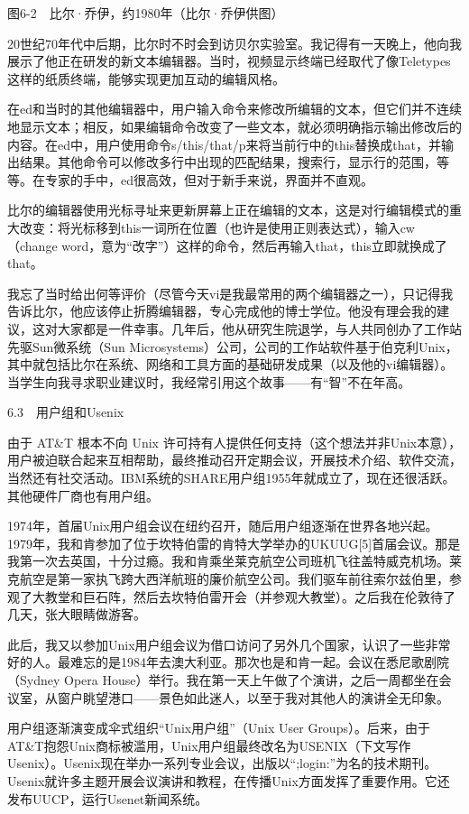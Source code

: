 \documentclass[a4paper,12pt,UTF8,twoside]{ctexbook}
\begin{document}
{{图6-2　比尔·乔伊，约1980年（比尔·乔伊供图）

20世纪70年代中后期，比尔时不时会到访贝尔实验室。我记得有一天晚上，他向我展示了他正在研发的新文本编辑器。当时，视频显示终端已经取代了像Teletypes这样的纸质终端，能够实现更加互动的编辑风格。

在ed和当时的其他编辑器中，用户输入命令来修改所编辑的文本，但它们并不连续地显示文本；相反，如果编辑命令改变了一些文本，就必须明确指示输出修改后的内容。在ed中，用户使用命令s/this/that/p来将当前行中的this替换成that，并输出结果。其他命令可以修改多行中出现的匹配结果，搜索行，显示行的范围，等等。在专家的手中，ed很高效，但对于新手来说，界面并不直观。

比尔的编辑器使用光标寻址来更新屏幕上正在编辑的文本，这是对行编辑模式的重大改变：将光标移到this一词所在位置（也许是使用正则表达式），输入cw（change word，意为“改字”）这样的命令，然后再输入that，this立即就换成了that。

我忘了当时给出何等评价（尽管今天vi是我最常用的两个编辑器之一），只记得我告诉比尔，他应该停止折腾编辑器，专心完成他的博士学位。他没有理会我的建议，这对大家都是一件幸事。几年后，他从研究生院退学，与人共同创办了工作站先驱Sun微系统（Sun Microsystems）公司，公司的工作站软件基于伯克利Unix，其中就包括比尔在系统、网络和工具方面的基础研发成果（以及他的vi编辑器）。当学生向我寻求职业建议时，我经常引用这个故事——有“智”不在年高。





6.3　用户组和Usenix


由于 AT\&T 根本不向 Unix 许可持有人提供任何支持（这个想法并非Unix本意），用户被迫联合起来互相帮助，最终推动召开定期会议，开展技术介绍、软件交流，当然还有社交活动。IBM系统的SHARE用户组1955年就成立了，现在还很活跃。其他硬件厂商也有用户组。

1974年，首届Unix用户组会议在纽约召开，随后用户组逐渐在世界各地兴起。1979年，我和肯参加了位于坎特伯雷的肯特大学举办的UKUUG[5]首届会议。那是我第一次去英国，十分过瘾。我和肯乘坐莱克航空公司班机飞往盖特威克机场。莱克航空是第一家执飞跨大西洋航班的廉价航空公司。我们驱车前往索尔兹伯里，参观了大教堂和巨石阵，然后去坎特伯雷开会（并参观大教堂）。之后我在伦敦待了几天，张大眼睛做游客。

此后，我又以参加Unix用户组会议为借口访问了另外几个国家，认识了一些非常好的人。最难忘的是1984年去澳大利亚。那次也是和肯一起。会议在悉尼歌剧院（Sydney Opera House）举行。我在第一天上午做了个演讲，之后一周都坐在会议室，从窗户眺望港口——景色如此迷人，以至于我对其他人的演讲全无印象。

用户组逐渐演变成伞式组织“Unix用户组”（Unix User Groups）。后来，由于AT\&T抱怨Unix商标被滥用，Unix用户组最终改名为USENIX（下文写作Usenix）。Usenix现在举办一系列专业会议，出版以“;login:”为名的技术期刊。Usenix就许多主题开展会议演讲和教程，在传播Unix方面发挥了重要作用。它还发布UUCP，运行Usenet新闻系统。





}}
\end{document}

